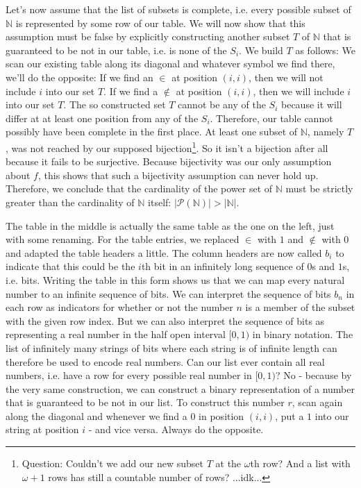 Let's now assume that the list of subsets is complete, i.e. every possible subset of $\mathbb{N}$ is represented by some row of our table. We will now show that this assumption must be false by explicitly constructing another subset $T$ of $\mathbb{N}$ that is guaranteed to be not in our table, i.e. is none of the $S_i$. We build $T$ as follows: We scan our existing table along its diagonal and whatever symbol we find there, we'll do the opposite: If we find an $\in$ at position $(i,i)$, then we will not include $i$ into our set $T$. If we find a $\notin$ at position $(i,i)$, then we will include $i$ into our set $T$. The so constructed set $T$ cannot be any of the $S_i$ because it will differ at at least one position from any of the $S_i$. Therefore, our table cannot possibly have been complete in the first place. At least one subset of $\mathbb{N}$, namely $T$, was not reached by our supposed bijection\footnote{Question: Couldn't we add our new subset $T$ at the $\omega$th row? And a list with $\omega + 1$ rows has still a countable number of rows? ...idk...}. So it isn't a bijection after all because it fails to be surjective. Because bijectivity was our only assumption about $f$, this shows that such a bijectivity assumption can never hold up. Therefore, we conclude that the cardinality of the power set of $\mathbb{N}$ must be strictly greater than the cardinality of $\mathbb{N}$ itself: $|\mathcal{P}(\mathbb{N})| > |\mathbb{N}|$.


\medskip
The table in the middle is actually the same table as the one on the left, just with some renaming. For the table entries, we replaced $\in$ with $1$ and $\notin$ with $0$ and adapted the table headers a little. The column headers are now called $b_i$ to indicate that this could be the $i$th bit in an infinitely long sequence of $0$s and $1$s, i.e. bits. Writing the table in this form shows us that we can map every natural number to an infinite sequence of bits. We can interpret the sequence of bits $b_n$ in each row as indicators for whether or not the number $n$ is a member of the subset with the given row index. But we can also interpret the sequence of bits as representing a real number in the half open interval $[0,1)$ in binary notation. The list of infinitely many strings of bits where each string is of infinite length can therefore be used to encode real numbers. Can our list ever contain all real numbers, i.e. have a row for every possible real number in $[0,1)$? No - because by the very same construction, we can construct a binary representation of a number that is guaranteed to be not in our list. To construct this number $r$, scan again along the diagonal and whenever we find a $0$ in position $(i,i)$, put a $1$ into our string at position $i$ - and vice versa. Always do the opposite.

